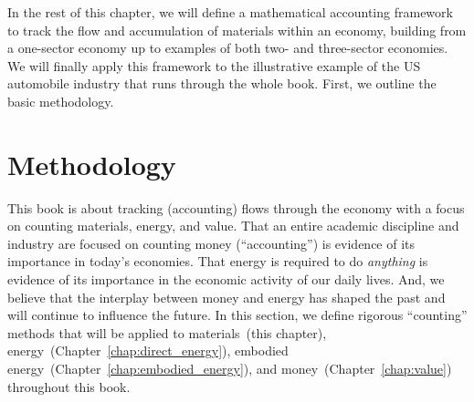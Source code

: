 In the rest of this chapter, we will define a mathematical accounting framework 
to track the flow and accumulation of
materials within an economy, 
building from a one-sector economy up to examples of both
two- and three-sector economies. 
We will finally apply this framework to the illustrative
example of the US automobile industry that runs through the whole book. 
First, we outline the basic methodology.

\section{Methodology}
\label{sec:Materials_Methodology}



This book is about tracking (accounting) flows through the 
economy with a focus on counting materials, energy, and value.
That an entire academic discipline and industry are focused on counting money (``accounting'')
is evidence of its importance in today's economies.
That energy is required to do \emph{anything} is evidence 
of its importance in the economic activity of our daily lives.
And, we believe that the interplay between money and energy
has shaped the past and will continue to influence the future.
In this section, we define rigorous ``counting'' methods that will be applied to
materials~(this chapter), 
energy~(Chapter~\ref{chap:direct_energy}), 
embodied energy~(Chapter~\ref{chap:embodied_energy}), and 
money~(Chapter~\ref{chap:value}) 
throughout this book.


